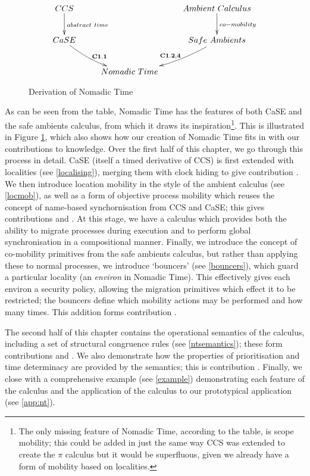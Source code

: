 \begin{figure}  
  \centering
\[\CompileMatrices
\xymatrix{
CCS \ar@{->}[d]^{abstract\ time} & &
Ambient\ Calculus \ar@{->}[d]^{co-mobility} \\ 
CaSE \ar@/_/[dr]^{\mathbf{C1.1}} & &
Safe\ Ambients \ar@/^/[dl]_{\mathbf{C1.2,4}} \\
& Nomadic\ Time & \\
}
\]
\caption{Derivation of Nomadic Time}
\label{fig:ntderiv}
\end{figure}

As can be seen from the table, Nomadic Time has the features of both
CaSE and the safe ambients calculus, from which it draws its
inspiration\footnote{The only missing feature of Nomadic Time,
  according to the table, is scope mobility; this could be added in
  just the same way CCS was extended to create the $\pi$ calculus but
  it would be superfluous, given we already have a form of mobility
  based on localities.}.  This is illustrated in Figure
\ref{fig:ntderiv}, which also shows how our creation of Nomadic Time
fits in with our contributions to knowledge. Over the first half of
this chapter, we go through this process in detail.  CaSE \cite{CaSE}
(itself a timed derivative of CCS) is first extended with localities
(see \ref{localising}), merging them with clock hiding to give
contribution .  We then introduce location mobility in the
style of the ambient calculus (see \ref{locmob}), as well as a form of
objective process mobility which reuses the concept of name-based
synchornisation from CCS and CaSE; this gives contributions 
and . At this stage, we have a calculus which provides both
the ability to migrate processes during execution and to perform
global synchronisation in a compositional manner.  Finally, we
introduce the concept of co-mobility primitives from the safe ambients
calculus, but rather than applying these to normal processes, we
introduce `bouncers' (see \ref{bouncers}), which guard a particular
locality (an \emph{environ} in Nomadic Time).  This effectively gives
each environ a security policy, allowing the migration primitives
which effect it to be restricted; the bouncers define which mobility
actions may be performed and how many times.  This addition forms
contribution .

The second half of this chapter contains the operational semantics of
the calculus, including a set of structural congruence rules (see
\ref{ntsemantics}); these form contributions  and
.  We also demonstrate how the properties of prioritisation
and time determinacy are provided by the semantics; this is
contribution .  Finally, we close with a comprehensive
example (see \ref{example}) demonstrating each feature of the calculus
and the application of the calculus to our prototypical application
(see \ref{app:nt}).

